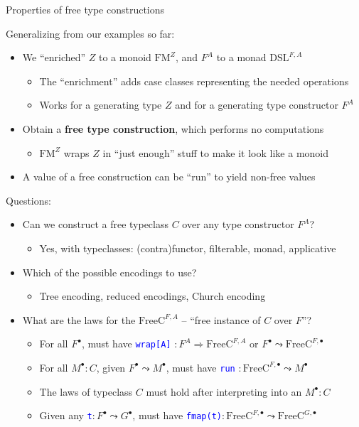 \documentclass[english,,russian]{beamer}
\begin{document}
\begin{frame}{Properties of free type constructions}

Generalizing from our examples so far:
\begin{itemize}
\item We ``enriched'' $Z$ to a monoid $\text{FM}^{Z}$, and $F^{A}$
to a monad $\text{DSL}^{F,A}$ 
\begin{itemize}
\item The ``enrichment'' adds case classes representing the needed operations
\item Works for a generating type $Z$ and for a generating type constructor
$F^{A}$
\end{itemize}
\item Obtain a \textbf{free type construction}, which performs no computations
\begin{itemize}
\item $\text{FM}^{Z}$ wraps $Z$ in ``just enough'' stuff to make it
look like a monoid
\end{itemize}
\item A value of a free construction can be ``run'' to yield non-free
values 
\end{itemize}
Questions:
\begin{itemize}
\item Can we construct a free typeclass $C$ over any type constructor $F^{A}$?
\begin{itemize}
\item Yes, with typeclasses: (contra)functor, filterable, monad, applicative
\end{itemize}
\item Which of the possible encodings to use?
\begin{itemize}
\item Tree encoding, reduced encodings, Church encoding
\end{itemize}
\item What are the laws for the $\text{FreeC}^{F,A}$ -- ``free instance
of $C$ over $F$''?
\begin{itemize}
\item For all $F^{\bullet}$, must have \texttt{\textcolor{blue}{\footnotesize{}wrap{[}A{]}}}
$:F^{A}\Rightarrow\text{FreeC}^{F,A}$ or $F^{\bullet}\leadsto\text{FreeC}^{F,\bullet}$
\item For all $M^{\bullet}:C$, given $F^{\bullet}\leadsto M^{\bullet}$,
must have \texttt{\textcolor{blue}{\footnotesize{}run}} $:\text{FreeC}^{F,\bullet}\leadsto M^{\bullet}$
\item The laws of typeclass $C$ must hold after interpreting into an $M^{\bullet}:C$
\item Given any \texttt{\textcolor{blue}{\footnotesize{}t}}$:F^{\bullet}\leadsto G^{\bullet}$,
must have \texttt{\textcolor{blue}{\footnotesize{}fmap(t)}}$:\text{FreeC}^{F,\bullet}\leadsto\text{FreeC}^{G,\bullet}$
\end{itemize}
\end{itemize}
\end{frame}
\end{document}
